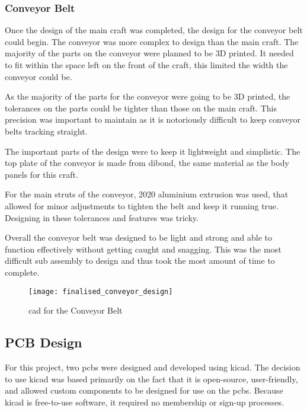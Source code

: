 \documentclass [12pt]{article}
\begin{document}
\subsubsection{Conveyor Belt}\label{sec:conveyor_cad}

Once the design of the main craft was completed, the design for the conveyor belt could begin. The conveyor was more complex to design than the main craft. The majority of the parts on the conveyor were planned to be 3D printed. It needed to fit within the space left on the front of the craft, this limited the width the conveyor could be. 

As the majority of the parts for the conveyor were going to be 3D printed, the tolerances on the parts could be tighter than those on the main craft. This precision was important to maintain as it is notoriously difficult to keep conveyor belts tracking straight.

The important parts of the design were to keep it lightweight and simplistic. The top plate of the conveyor is made from \gls{dibond}, the same material as the body panels for this craft. 

For the main struts of the conveyor, 2020 aluminium extrusion was used, that allowed for minor adjustments to tighten the belt and keep it running true. Designing in these tolerances and features was tricky.  

Overall the conveyor belt was designed to be light and strong and able to function effectively without getting caught and snagging. This was the most difficult sub assembly to design and thus took the most amount of time to complete. 
 
\begin{figure}[H]
\centerline{\texttt{[image: finalised\_conveyor\_design]}}
\caption{\gls{cad} for the Conveyor Belt}
\label{fig:finalised_conveyor+_design}
\end{figure}

\subsection{PCB Design}\label{sec:pcb_design}

For this project, two \gls{pcb}s were designed and developed using \gls{kicad}. The decision to use \gls{kicad} was based primarily on the fact that it is open-source, user-friendly, and allowed custom components to be designed for use on the \gls{pcb}s. Because \gls{kicad} is free-to-use software, it required no membership or sign-up processes. 
\end{document}
